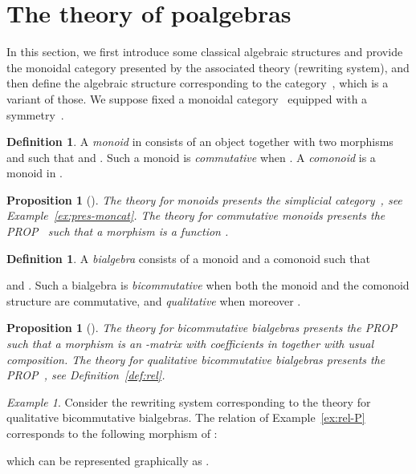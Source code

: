 \documentclass[submission,copyright,creativecommons]{eptcs}
\newtheorem{proposition}[theorem]{Proposition}
\theoremstyle{definition}
\newtheorem{definition}[theorem]{Definition}
\theoremstyle{remark}
\newtheorem{example}[theorem]{Example}
\begin{document}
\section{The theory of poalgebras}
\label{sec:poalgebras}
In this section, we first introduce some classical algebraic structures and
provide the monoidal category presented by the associated theory (\ie rewriting
system), and then define the algebraic structure corresponding to the
category~, which is a variant of those. We suppose fixed a monoidal
category~ equipped with a symmetry~.

\begin{definition}
  \label{def:monoid}
  A \emph{monoid}  in  consists of an object  together with
  two morphisms  and  such that
   and
  . Such a monoid
  is \emph{commutative} when . A \emph{comonoid}
   is a monoid in .
\end{definition}

\begin{proposition}[\cite{maclane:cwm, lafont2003towards}]
  \label{prop:free-monoid}
  The theory for monoids presents the simplicial category~, see
  Example~\ref{ex:pres-moncat}. The theory for commutative monoids presents the
  PROP~ such that a morphism  is a function
  .
\end{proposition}

\begin{definition}
  \label{def:bialg}
  A \emph{bialgebra}  consists of a monoid
   and a comonoid  such that
  
  and . Such a bialgebra is \emph{bicommutative}
  when both the monoid and the comonoid structure are commutative, and
  \emph{qualitative} when moreover .
\end{definition}

\begin{proposition}[\cite{maclane1965categorical, hyland2000symmetric, pirashvili2001prop, lafont2003towards, lack2004composing, mimram2011structure}]
  \label{prop:free-bialgebra}
  The theory for bicommutative bialgebras presents the PROP~
  such that a morphism  is an -matrix with coefficients
  in  together with usual composition. The theory for qualitative
  bicommutative bialgebras presents the PROP~, see
  Definition~\ref{def:rel}.
\end{proposition}

\begin{example}
  Consider the rewriting system  corresponding to the theory for
  qualitative bicommutative bialgebras. The relation of Example~\ref{ex:rel-P}
  corresponds to the following morphism of :
  
  which can be represented graphically as
  .
\end{example}
\end{document}
